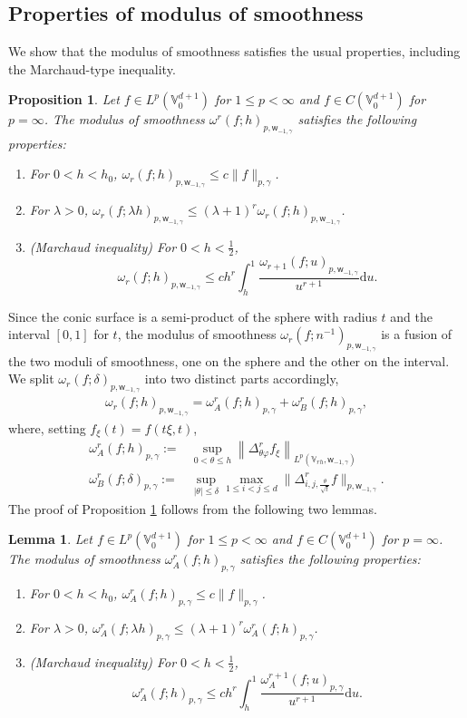 \documentclass{amsart}
\newtheorem{lem}[thm]{Lemma}
\newtheorem{prop}[thm]{Proposition}
\theoremstyle{remark}
\def\d{\mathrm{d}}
\def\g{{\gamma}}
\def\t{{\theta}}
\def\l{{\lambda}}
\def\o{{\omega}}
\def\VV{{\mathbb V}}
\def\d{\mathrm{d}}
\def\sw{{\mathsf w}}
\def\g{{\gamma}}
\def\t{{\theta}}
\def\l{{\lambda}}
\def\o{{\omega}}
\def\VV{{\mathbb V}}
\def\f{\frac}
\def\f{\frac}
\begin{document}
\subsection{Properties of modulus of smoothness} 
We show that the modulus of smoothness satisfies the usual properties, including the Marchaud-type inequality.  

\begin{prop}\label{prop-moduleV0}
Let $f\in L^p(\VV^{d+1}_0)$ for $1\leq p<\infty$ and $f\in C(\VV^{d+1}_0)$ for $p=\infty$. The modulus of 
smoothness $\o^r(f; h)_{p,\sw_{-1,\g}}$ satisfies the following properties:
\begin{enumerate} [\rm  (i)]
	\item For $0< h<h_0$, $  \o_r(f; h)_{p,\sw_{-1,\g}}\leq c \|f\|_{p,\g }$.
	\item For $\l >0$, $\o_r(f; \lambda h)_{p,\sw_{-1,\g}}\leq (\l+1)^r \o_r(f; h)_{p,\sw_{-1,\g}}$.
	\item (Marchaud inequality) For $0<h<\f12$, 
$$
    \o_r(f; h)_{p,\sw_{-1,\g}}\leq c  h^r \int_h^1\f{\o_{r+1}(f; u)_{p,\sw_{-1,\g}}}{u^{r+1}}  \d u .
$$
	\end{enumerate}
\end{prop}

Since the conic surface is a semi-product of the sphere with radius $t$ and the interval $[0,1]$ for $t$, 
the modulus of smoothness $\o_r(f;  n^{-1})_{p,\sw_{-1,\g}}$ is a fusion of the two moduli of smoothness, 
one on the sphere and the other on the interval. We split $\o_r(f; \delta)_{p, \sw_{-1,\g}}$ into two distinct 
parts accordingly,  
\begin{align}\label{modulusAB}    
\o_r(f; h)_{p, \sw_{-1,\g}} = \omega_A^r (f;h)_{p,\g} + \omega^r_B(f; h)_{p,\g},
\end{align}
where, setting $f_\xi(t) = f(t\xi,t)$, 
\begin{align*} 
\omega^r_A(f; h)_{p,\g} := &  \sup_{0<\t \le h} \left\| \Delta_{\t\varphi}^r f_\xi \right\|_{L^p( \VV_{r h},\sw_{-1,\g}) }   \\ 
\omega_B^r (f;\delta)_{p,\g} := & \sup_{|\t| \le \delta} \max_{1\le i<j\le d} \Big\| \Delta_{i,j, \frac{\t}{\sqrt{t}}}^r f\Big \|_{p,\sw_{-1,\g}}. 
\end{align*}
The proof of Proposition \ref{prop-moduleV0} follows from the following two lemmas. 
 
\begin{lem}\label{prop-moduleA}
	Let $f\in L^p(\VV^{d+1}_0)$ for $1\leq p<\infty$ and $f\in C(\VV^{d+1}_0)$ for $p=\infty$. The modulus of 
	smoothness $\o^r_A(f; h)_{p,\g}$ satisfies the following properties:
	\begin{enumerate} [\rm  (i)]
		\item For $0< h<h_0$, $  \o_A^r(f; h)_{p,\g}\leq c \|f\|_{p,\g }$.
		\item For $\l >0$, $\o_A^r(f; \lambda h)_{p,\g }\leq (\l+1)^r \o_A^r(f; h)_{p,\g }$.
		\item (Marchaud inequality) For $0<h<\f12$, 
	 $$
	\o_A^r(f; h)_{p,\g }\leq c  h^r \int_h^1\f{\o_A^{r+1}(f; u)_{p,\g}}{u^{r+1}}  \d u .
	$$
	\end{enumerate}
\end{lem}
 
\end{document}

